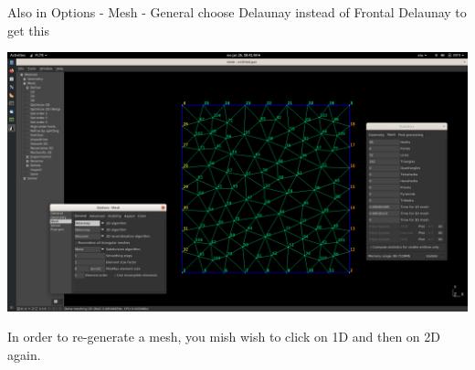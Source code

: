 Also in Options - Mesh - General choose Delaunay instead of Frontal Delaunay to get this 

\includegraphics[width=15cm]{images/app_gmsh/gmsh_06}

In order to re-generate a mesh, you mish wish to click on 1D and then on 2D again. 


